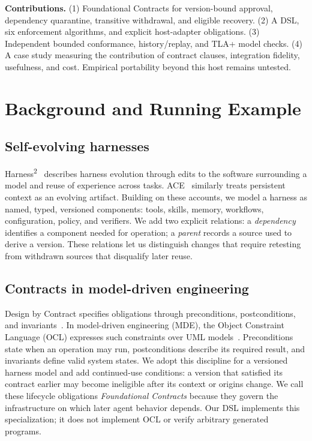 \documentclass[letterpaper,journal]{IEEEtran}
\newcommand{\harness}{Harness\textsuperscript{2}}
\begin{document}
\textbf{Contributions.} (1) Foundational Contracts for version-bound approval, dependency quarantine, transitive withdrawal, and eligible recovery. (2) A DSL, six enforcement algorithms, and explicit host-adapter obligations. (3) Independent bounded conformance, history/replay, and TLA+ model checks. (4) A case study measuring the contribution of contract clauses, integration fidelity, usefulness, and cost. Empirical portability beyond this host remains untested. 

\section{Background and Running Example}\label{sec:background}
\subsection{Self-evolving harnesses}
\harness{}~\cite{harness2} describes harness evolution through edits to the software surrounding a model and reuse of experience across tasks. ACE~\cite{ace} similarly treats persistent context as an evolving artifact. Building on these accounts, we model a harness as named, typed, versioned components: tools, skills, memory, workflows, configuration, policy, and verifiers. We add two explicit relations: a \emph{dependency} identifies a component needed for operation; a \emph{parent} records a source used to derive a version. These relations let us distinguish changes that require retesting from withdrawn sources that disqualify later reuse.

\subsection{Contracts in model-driven engineering}\label{sec:mde}
Design by Contract specifies obligations through preconditions, postconditions, and invariants~\cite{meyerdbc}. In model-driven engineering (MDE), the Object Constraint Language (OCL) expresses such constraints over UML models~\cite{ocl}. Preconditions state when an operation may run, postconditions describe its required result, and invariants define valid system states. We adopt this discipline for a versioned harness model and add continued-use conditions: a version that satisfied its contract earlier may become ineligible after its context or origins change. We call these lifecycle obligations \emph{Foundational Contracts} because they govern the infrastructure on which later agent behavior depends. Our DSL implements this specialization; it does not implement OCL or verify arbitrary generated programs.
\end{document}
